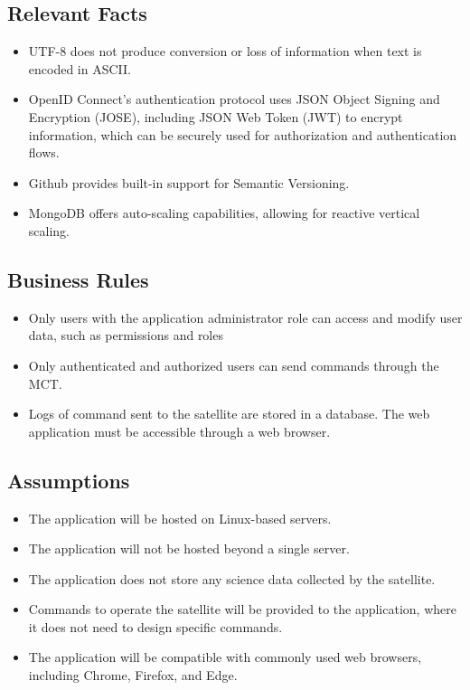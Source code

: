 \documentclass[12pt]{article}
\begin{document}
\subsection{Relevant Facts}
\begin{itemize}
    \item UTF-8 does not produce conversion or loss of information when text is encoded in ASCII.
    \item OpenID Connect’s authentication protocol uses JSON Object Signing and Encryption (JOSE), including JSON Web Token (JWT) to encrypt information, which can be securely used for authorization and authentication flows.
    \item Github provides built-in support for Semantic Versioning.
    \item MongoDB offers auto-scaling capabilities, allowing for reactive vertical scaling.
    
\end{itemize}
\subsection{Business Rules}
\begin{itemize}
    \item Only users with the application administrator role can access and modify user data, such as permissions and roles
    \item Only authenticated and authorized users can send commands through the MCT.
    \item Logs of command sent to the satellite are stored in a database.
    The web application must be accessible through a web browser.
\end{itemize}

\subsection{Assumptions}
\begin{itemize}
    \item The application will be hosted on Linux-based servers.
    \item The application will not be hosted beyond a single server.
    \item The application does not store any science data collected by the satellite.
    \item Commands to operate the satellite will be provided to the application, where it does not need to design specific commands.
    \item The application will be compatible with commonly used web browsers, including Chrome, Firefox, and Edge.
\end{itemize}
\end{document}
